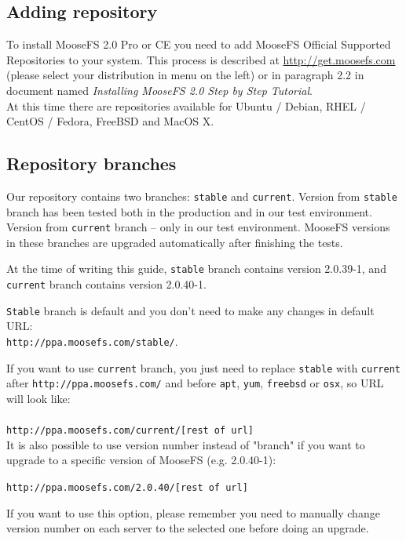 \documentclass[a4paper,11pt,english]{report}
\def\code#1{\texttt{#1}}
\begin{document}
	\subsection{Adding repository}
		To install MooseFS 2.0 Pro or CE you need to add MooseFS Official Supported Repositories to your system. This process is described at \url{http://get.moosefs.com} (please select your distribution in menu on the left) or in paragraph 2.2 in document named \textit{Installing MooseFS 2.0 Step by Step Tutorial}.\\

		At this time there are repositories available for Ubuntu / Debian, RHEL / CentOS / Fedora, FreeBSD and MacOS X.
			
	\subsection{Repository branches}
		Our repository contains two branches: \code{stable} and \code{current}. Version from \code{stable} branch has been tested both in the production and in our test environment. Version from \code{current} branch -- only in our test environment. MooseFS versions in these branches are upgraded automatically after finishing the tests.
		
		At the time of writing this guide, \code{stable} branch contains version 2.0.39-1, and \code{current} branch contains version 2.0.40-1.

		\code{Stable} branch is default and you don't need to make any changes in default URL: \\
		\code{http://ppa.moosefs.com/stable/}.
		
		If you want to use \code{current} branch, you just need to replace \code{stable} with \code{current} after \code{http://ppa.moosefs.com/} and before \code{apt}, \code{yum}, \code{freebsd} or \code{osx}, so URL will look like: \\\\
		\code{http://ppa.moosefs.com/current/[rest of url]} \\
		
		It is also possible to use version number instead of "branch" if you want to upgrade to a specific version of MooseFS (e.g. 2.0.40-1):
		
		\code{http://ppa.moosefs.com/2.0.40/[rest of url]}
		
		If you want to use this option, please remember you need to manually change version number on each server to the selected one before doing an upgrade.
		
\end{document}
